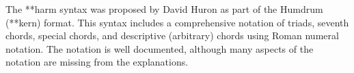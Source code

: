 The **harm syntax was proposed by David Huron as part of the
Humdrum (**kern) format. This syntax includes a
comprehensive notation of triads, seventh chords, special
chords, and descriptive (arbitrary) chords using Roman
numeral notation. The notation is well documented, although
many aspects of the notation are missing from the
explanations.
